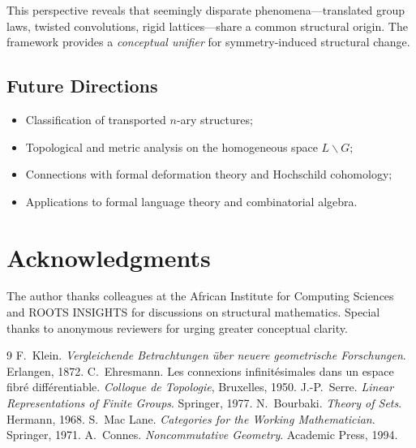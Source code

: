 \documentclass[11pt,a4paper]{article}
\begin{document}
	This perspective reveals that seemingly disparate phenomena—translated group laws, twisted convolutions, rigid lattices—share a common structural origin. The framework provides a \emph{conceptual unifier} for symmetry-induced structural change.
	
	\subsection*{Future Directions}
	\begin{itemize}
		\item Classification of transported $n$-ary structures;
		\item Topological and metric analysis on the homogeneous space $L\backslash G$;
		\item Connections with formal deformation theory and Hochschild cohomology;
		\item Applications to formal language theory and combinatorial algebra.
	\end{itemize}
	
	\section*{Acknowledgments}
	The author thanks colleagues at the African Institute for Computing Sciences and ROOTS INSIGHTS for discussions on structural mathematics. Special thanks to anonymous reviewers for urging greater conceptual clarity.
	
	\begin{thebibliography}{9}
		 F.\ Klein. \emph{Vergleichende Betrachtungen über neuere geometrische Forschungen}. Erlangen, 1872.
		 C.\ Ehresmann. Les connexions infinitésimales dans un espace fibré différentiable. \emph{Colloque de Topologie}, Bruxelles, 1950.
		 J.-P.\ Serre. \emph{Linear Representations of Finite Groups}. Springer, 1977.
		 N.\ Bourbaki. \emph{Theory of Sets}. Hermann, 1968.
		 S.\ Mac Lane. \emph{Categories for the Working Mathematician}. Springer, 1971.
		 A.\ Connes. \emph{Noncommutative Geometry}. Academic Press, 1994.
	\end{thebibliography}
	
\end{document}
